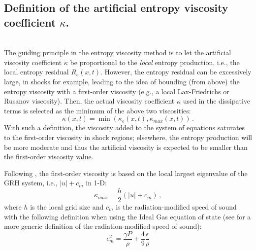 \documentclass[times,doublespace]{fldauth}%
\begin{document}
\subsection{Definition of the artificial entropy viscosity coefficient $\kappa$.}\label{sec:visc-coeff-def}
%
 \\
The guiding principle in the entropy viscosity method \cite{jlg1, jlg2} is to let the artificial viscosity coefficient $\kappa$ be proportional to the \emph{local} entropy
production, i.e., the local entropy residual $R_e(x,t)$. However, the entropy residual can be excessively large, in shocks for example, leading
to the idea of bounding (from above) the entropy viscosity with a first-order viscosity (e.g., a local Lax-Friedrichs or Rusanov viscosity).
Then, the actual viscosity coefficient $\kappa$ used in the dissipative terms %
is selected as the minimum of the above two viscosities:  
%
\begin{equation}
\kappa(x,t) = \min ( \kappa_e(x,t), \kappa_{max}(x,t) ) \, . 
\end{equation}
%
With such a definition, the viscosity added to the system of equations saturates to the first-order viscosity in shock regions; elsewhere, 
the entropy production will be more moderate and thus the artificial viscosity is expected to be smaller
than the first-order viscosity value.

Following \cite{our_jcp_radhy_paper}, the first-order viscosity is based on the local largest eigenvalue of the GRH system, i.e., $|u| + c_m$ in 1-D:
%
\begin{equation}
\label{eq:equation8}
\kappa_{max} = \frac{h}{2} \left( |u| + c_m \right) \,,
\end{equation}  
%
where $h$ is the local grid size and $c_m$ is the radiation-modified speed of sound with the following definition when using the Ideal Gas equation of state (see \cite{our_jcp_radhy_paper} for a more generic definition of the radiation-modified speed of sound):
%
\begin{equation}
c_m^2 = \frac{ \gamma P}{\rho} + \frac{4}{9} \frac{\epsilon}{\rho}
\end{equation}
%
\end{document}
